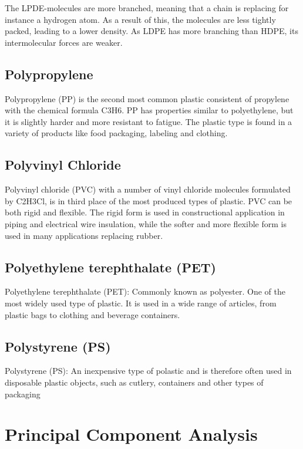 The LPDE-molecules are more branched, meaning that a chain is replacing for instance a hydrogen atom. As a result of this, the molecules are less tightly packed, leading to a lower density.  As LDPE has more branching than HDPE, its intermolecular forces are weaker. 


\subsection{Polypropylene}
Polypropylene (PP) is the second most common plastic consistent of propylene with the chemical formula C3H6. PP has properties similar to polyethylene, but it is slightly harder and more resistant to fatigue. The plastic type is found in a variety of products like food packaging, labeling and clothing. 

\subsection{Polyvinyl Chloride}
Polyvinyl chloride (PVC) with a number of vinyl chloride molecules formulated by C2H3Cl, is in third place of the most produced types of plastic. PVC can be both rigid and flexible. The rigid form is used in constructional application in piping and electrical wire insulation, while the softer and more flexible form is used in many applications replacing rubber. 

\subsection{Polyethylene terephthalate (PET)}
Polyethylene terephthalate (PET): Commonly known as polyester. One of the most widely used type of plastic. It is used in a wide range of articles, from plastic bags to clothing and beverage containers.

\subsection{Polystyrene (PS)}
Polystyrene (PS): An inexpensive type of polastic and is therefore often used in disposable plastic objects, such as cutlery, containers and other types of packaging



\section{Principal Component Analysis}

